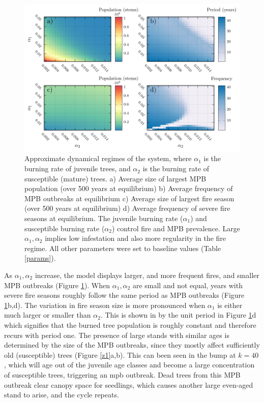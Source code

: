 \begin{figure}
  \includegraphics[width=\textwidth]{chapter_3/a1_a2_phase.pdf}
\caption[Approximate dynamical regimes of the system.]{Approximate dynamical regimes of the system, where $\alpha_1$ is the burning rate of juvenile trees, and $\alpha_2$ is the burning rate of susceptible (mature) trees. a) Average size of largest MPB population (over 500 years at equilibrium) b) Average frequency of MPB outbreaks at equilibrium c) Average size of largest fire season (over 500 years at equilibrium) d) Average frequency of severe fire seasons at equilibrium. The juvenile burning rate ($\alpha_1$) and susceptible burning rate ($\alpha_2$) control fire and MPB prevalence. Large $\alpha_1,\alpha_2$ implies low infestation and also more regularity in the fire regime. All other parameters were set to baseline values (Table \ref{params}).}  
\label{dynamical_regimes}
\end{figure}


    As $\alpha_1, \alpha_2$ increase, the model displays larger, and more frequent fires, and smaller MPB outbreaks (Figure \ref{dynamical_regimes}). When $\alpha_1, \alpha_2$ are small and not equal, years with severe fire seasons roughly follow the same period as MPB outbreaks  (Figure \ref{dynamical_regimes}b,d). The variation in fire season size is more pronounced when $\alpha_1$ is either much larger or smaller than $\alpha_2$. This is shown in by the unit period in Figure \ref{dynamical_regimes}d which signifies that the burned tree population is roughly constant and therefore recurs with period one. The presence of large stands with similar ages is determined by the size of the MPB outbreaks, since they mostly affect sufficiently old (susceptible) trees (Figure \ref{z1}a,b). This can been seen in the bump at $k  = 40$, which will age out of the juvenile age classes and become a large concentration of susceptible trees, triggering an mpb outbreak. Dead trees from this MPB outbreak clear canopy space for seedlings, which causes another large even-aged stand to arise, and the cycle repeats.


